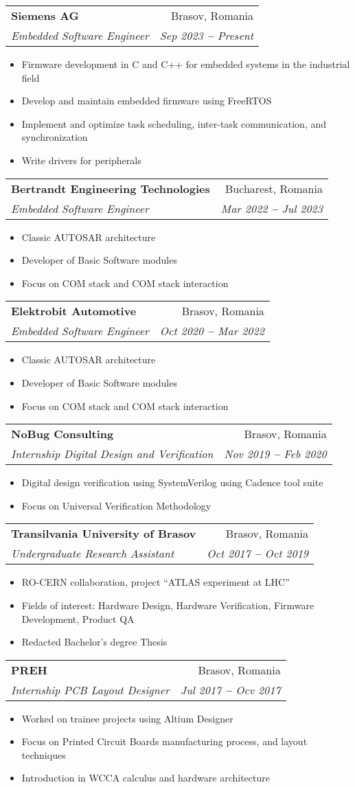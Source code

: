\documentclass[letterpaper,11pt]{article}
\makeatletter
\newcommand{\resumeItem}[1]{
  \item\small{
    {#1 \vspace{-2pt}}
  }
}
\newcommand{\resumeSubheading}[4]{
  \vspace{-2pt}\item
    \begin{tabular*}{0.97\textwidth}[t]{l@{\extracolsep{\fill}}r}
      \textbf{#1} & #2 \\
      \textit{\small#3} & \textit{\small #4} \\
    \end{tabular*}\vspace{-7pt}
}
\newcommand{\resumeItemListStart}{\begin{itemize}}
\newcommand{\resumeItemListEnd}{\end{itemize}\vspace{-5pt}}
\makeatother
\begin{document}
    \resumeSubheading
      {Siemens AG}{Brasov, Romania}
      {Embedded Software Engineer}{Sep 2023 \textbf{--} Present}
        \resumeItemListStart
            \resumeItem{Firmware development in C and C++ for embedded systems in the industrial field}
            \resumeItem{Develop and maintain embedded firmware using FreeRTOS}
            \resumeItem{Implement and optimize task scheduling, inter-task communication, and synchronization}
            \resumeItem{Write drivers for peripherals}
            
        \resumeItemListEnd
    
    \resumeSubheading
      {Bertrandt Engineering Technologies}{Bucharest, Romania}
      {Embedded Software Engineer}{Mar 2022 \textbf{--} Jul 2023}
        \resumeItemListStart
            \resumeItem{Classic AUTOSAR architecture}
            \resumeItem{Developer of Basic Software modules}
            \resumeItem{Focus on COM stack and COM stack interaction}
        \resumeItemListEnd

    \resumeSubheading
      {Elektrobit Automotive}{Brasov, Romania}
      {Embedded Software Engineer}{Oct 2020 \textbf{--} Mar 2022}
        \resumeItemListStart
            \resumeItem{Classic AUTOSAR architecture}
            \resumeItem{Developer of Basic Software modules}
            \resumeItem{Focus on COM stack and COM stack interaction}
        \resumeItemListEnd

    \resumeSubheading
      {NoBug Consulting}{Brasov, Romania}
      {Internship Digital Design and Verification}{Nov 2019 \textbf{--} Feb 2020}
        \resumeItemListStart
            \resumeItem{Digital design verification using SystemVerilog using Cadence tool suite}
            \resumeItem{Focus on Universal Verification Methodology}
        \resumeItemListEnd

    \resumeSubheading
      {Transilvania University of Brasov}{Brasov, Romania}
      {Undergraduate Research Assistant}{Oct 2017 \textbf{--} Oct 2019}
        \resumeItemListStart
            \resumeItem{RO-CERN collaboration, project ``ATLAS experiment at LHC''}
            \resumeItem{Fields of interest: Hardware Design, Hardware Verification, Firmware Development, Product QA}
            \resumeItem{Redacted Bachelor's degree Thesis}
        \resumeItemListEnd

    \resumeSubheading
      {PREH}{Brasov, Romania}
      {Internship PCB Layout Designer}{Jul 2017 \textbf{--} Ocv 2017}
        \resumeItemListStart
            \resumeItem{Worked on trainee projects using Altium Designer}
            \resumeItem{Focus on Printed Circuit Boards manufacturing process, and layout techniques}
            \resumeItem{Introduction in WCCA calculus and hardware architecture}
        \resumeItemListEnd
\end{document}
